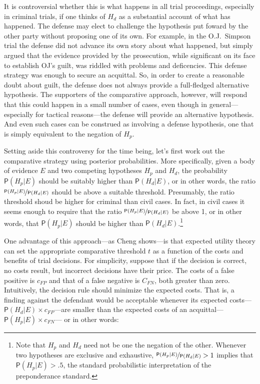 \documentclass[
  10pt,
  dvipsnames,enabledeprecatedfontcommands]{scrartcl}
\newcommand{\pr}[1]{\mathsf{P}(#1)}
\begin{document}
It is controversial whether this is what happens in all trial
proceedings, especially in criminal trials, if one thinks of \(H_d\) as
a substantial account of what has happened. The defense may elect to
challenge the hypothesis put foward by the other party without proposing
one of its own. For example, in the O.J.~Simpson trial the defense did
not advance its own story about what happened, but simply argued that
the evidence provided by the prosecution, while significant on its face
to establish OJ's guilt, was riddled with problems and deficencies. This
defense strategy was enough to secure an acquittal. So, in order to
create a reasonable doubt about guilt, the defense does not always
provide a full-fledged alternative hypothesis. The supporters of the
comparative approach, however, will respond that this could happen in a
small number of cases, even though in general---especially for tactical
reasons---the defense will provide an alternative hypothesis. And even
such cases can be construed as involving a defense hypothesis, one that
is simply equivalent to the negation of \(H_p\).

Setting aside this controversy for the time being, let's first work out
the comparative strategy using posterior probabilities. More
specifically, given a body of evidence \(E\) and two competing
hypotheses \(H_p\) and \(H_d\), the probability \(\pr{H_p \vert E}\)
should be suitably higher than \(\pr{H_d \vert E}\), or in other words,
the ratio \(\nicefrac{\pr{H_p \vert E}}{\pr{H_d \vert E}}\) should be
above a suitable threshold. Presumably, the ratio threshold shoud be
higher for criminal than civil cases. In fact, in civil cases it seems
enough to require that the ratio
\(\nicefrac{\pr{H_p \vert E}}{\pr{H_d \vert E}}\) be above 1, or in
other words, that \(\pr{H_p \vert E}\) should be higher than
\(\pr{H_d \vert E}\).\footnote{Note that $H_p$ and $H_d$ need not be one the negation of the other. 
Whenever two hypotheses are exclusive and exhaustive, $\nicefrac{\pr{H_p \vert E}}{\pr{H_d \vert E}}>1$ 
implies that $\pr{H_p \vert E}>.5$, the standard probabilistic interpretation of the preponderance standard.}

One advantage of this approach---as Cheng shows---is that expected
utility theory can set the appropriate comparative threshold \(t\) as a
function of the costs and benefits of trial decisions. For simplicity,
suppose that if the decision is correct, no costs result, but incorrect
decisions have their price.  The costs of a false positive is
\(c_{FP}\) and that of a false negative is \(C_{FN}\), both greater than
zero. Intuitively, the decision rule should minimize the expected costs.
That is, a finding against the defendant would be acceptable whenever
its expected costs---\(\pr{H_d \vert E} \times c_{FP}\)---are smaller
than the expected costs of an
acquittal---\(\pr{H_p \vert E}\times c_{FN}\)--- or in other words:
\end{document}
